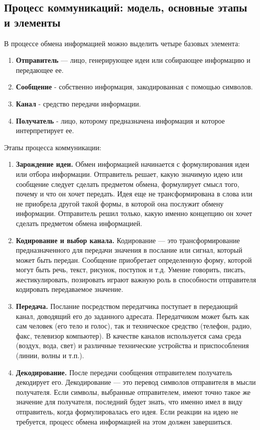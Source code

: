 \documentclass[a4paper,12pt,oneside,final]{extarticle}
\numberwithin{equation}{section}
\begin{document}
\subsection{Процесс коммуникаций: модель, основные этапы и элементы}
В процессе обмена информацией можно выделить четыре базовых элемента:
\begin{enumerate}
	\item \textbf{Отправитель} --- лицо, генерирующее идеи или собирающее информацию и передающее ее.
	\item \textbf{Сообщение} - собственно информация, закодированная с помощью символов.
	\item \textbf{Канал} - средство передачи информации.
	\item \textbf{Получатель} - лицо, которому предназначена информация и которое интерпретирует ее.
\end{enumerate}

Этапы процесса коммуникации:
\begin{enumerate}
	\item \textbf{Зарождение идеи.} 
	Обмен информацией начинается с формулирования идеи или отбора информации. 
	Отправитель решает, какую значимую идею или сообщение следует сделать предметом обмена, формулирует смысл того, почему и что он хочет передать. 
	Идея еще не трансформирована в слова или не приобрела другой такой формы, в которой она послужит обмену информации. 
	Отправитель решил только, какую именно концепцию он хочет сделать предметом обмена информацией.
	\item \textbf{Кодирование и выбор канала.}
	Кодирование --- это трансформирование предназначенного для передачи значения в послание или сигнал, который может быть передан. 
	Сообщение приобретает определенную форму, которой могут быть речь, текст, рисунок, поступок и т.д. 
	Умение говорить, писать, жестикулировать, позировать играют важную роль в способности отправителя кодировать передаваемое значение.
	\item \textbf{Передача.}
	Послание посредством передатчика поступает в передающий канал, доводящий его до заданного адресата. 
	Передатчиком может быть как сам человек (его тело и голос), так и техническое средство (телефон, радио, факс, телевизор компьютер). 
	В качестве каналов используется сама среда (воздух, вода, свет) и различные технические устройства и приспособления (линии, волны и т.п.).
	\item \textbf{Декодирование.} 
	После передачи сообщения отправителем получатель декодирует его. 
	Декодирование --- это перевод символов отправителя в мысли получателя.
	Если символы, выбранные отправителем, имеют точно такое же значение для получателя, последний будет знать, что именно имел в виду отправитель, когда формулировалась его идея.
	Если реакции на идею не требуется, процесс обмена информацией на этом должен завершиться.
\end{enumerate}
\end{document}

